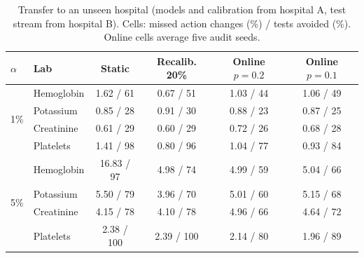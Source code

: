 \begin{table}[t]\centering\footnotesize
\caption{Transfer to an unseen hospital (models and calibration from hospital A, test stream from hospital B). Cells: missed action changes (\%) / tests avoided (\%). Online cells average five audit seeds.}
\label{tab:external}\setlength{\tabcolsep}{2.5pt}
\begin{tabular}{llcccc}\toprule
$\alpha$ & Lab & Static & Recalib. 20\% & Online $p{=}0.2$ & Online $p{=}0.1$ \\ \midrule
\multirow{4}{*}{1\%} & Hemoglobin & 1.62 / 61 & 0.67 / 51 & 1.03 / 44 & 1.06 / 49 \\
 & Potassium & 0.85 / 28 & 0.91 / 30 & 0.88 / 23 & 0.87 / 25 \\
 & Creatinine & 0.61 / 29 & 0.60 / 29 & 0.72 / 26 & 0.68 / 28 \\
 & Platelets & 1.41 / 98 & 0.80 / 96 & 1.04 / 77 & 0.93 / 84 \\
\midrule
\multirow{4}{*}{5\%} & Hemoglobin & 16.83 / 97 & 4.98 / 74 & 4.99 / 59 & 5.04 / 66 \\
 & Potassium & 5.50 / 79 & 3.96 / 70 & 5.01 / 60 & 5.15 / 68 \\
 & Creatinine & 4.15 / 78 & 4.10 / 78 & 4.96 / 66 & 4.64 / 72 \\
 & Platelets & 2.38 / 100 & 2.39 / 100 & 2.14 / 80 & 1.96 / 89 \\
\bottomrule\end{tabular}\end{table}

